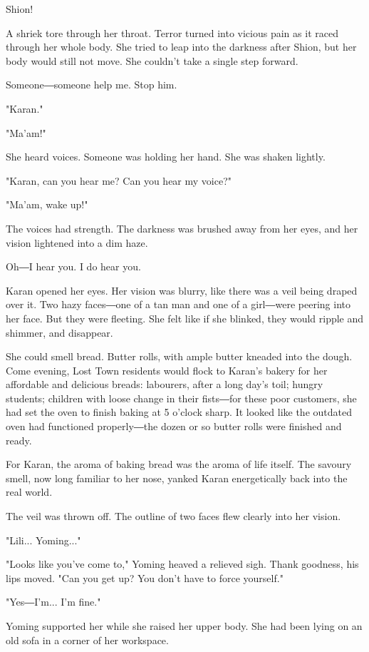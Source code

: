 Shion!

A shriek tore through her throat. Terror turned into vicious pain as it
raced through her whole body. She tried to leap into the darkness after
Shion, but her body would still not move. She couldn't take a single
step forward.

Someone―someone help me. Stop him.

"Karan."

"Ma'am!"

She heard voices. Someone was holding her hand. She was shaken lightly.

"Karan, can you hear me? Can you hear my voice?"

"Ma'am, wake up!"

The voices had strength. The darkness was brushed away from her eyes,
and her vision lightened into a dim haze.

Oh―I hear you. I do hear you.

Karan opened her eyes. Her vision was blurry, like there was a veil
being draped over it. Two hazy faces―one of a tan man and one of a
girl―were peering into her face. But they were fleeting. She felt like
if she blinked, they would ripple and shimmer, and disappear.

She could smell bread. Butter rolls, with ample butter kneaded into the
dough. Come evening, Lost Town residents would flock to Karan's bakery
for her affordable and delicious breads: labourers, after a long day's
toil; hungry students; children with loose change in their fists―for
these poor customers, she had set the oven to finish baking at 5 o'clock
sharp. It looked like the outdated oven had functioned properly―the
dozen or so butter rolls were finished and ready.

For Karan, the aroma of baking bread was the aroma of life itself. The
savoury smell, now long familiar to her nose, yanked Karan energetically
back into the real world.

The veil was thrown off. The outline of two faces flew clearly into her
vision.

"Lili... Yoming..."

"Looks like you've come to," Yoming heaved a relieved sigh. Thank
goodness, his lips moved. "Can you get up? You don't have to force
yourself."

"Yes―I'm... I'm fine."

Yoming supported her while she raised her upper body. She had been lying
on an old sofa in a corner of her workspace.

